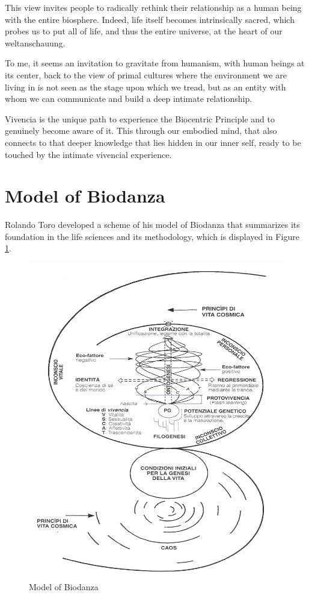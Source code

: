 \documentclass[
  11pt,
]{book}
\begin{document}
This view invites people to radically rethink their relationship as a human being with the entire biosphere. Indeed, life itself becomes intrinsically sacred, which probes us to put all of life, and thus the entire universe, at the heart of our weltanschauung.

To me, it seems an invitation to gravitate from humanism, with human beings at its center, back to the view of primal cultures where the environment we are living in is not seen as the stage upon which we tread, but as an entity with whom we can communicate and build a deep intimate relationship.

Vivencia is the unique path to experience the Biocentric Principle and to genuinely become aware of it. This through our embodied mind, that also connects to that deeper knowledge that lies hidden in our inner self, ready to be touched by the intimate vivencial experience.

\hypertarget{sectionModelOfBiodanza}{%
\section{Model of Biodanza}\label{sectionModelOfBiodanza}}

Rolando Toro developed a scheme of his model of Biodanza that summarizes its foundation in the life sciences and its methodology, which is displayed in Figure \ref{fig:model}.

\begin{figure}

{\centering \includegraphics[width=1\linewidth]{./figs/biodanzaModel} 

}

\caption{Model of Biodanza}\label{fig:model}
\end{figure}
\end{document}
